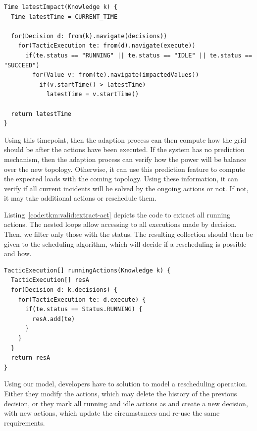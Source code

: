 \begin{lstlisting}[style=customc, caption=Get latest timepoint at which the impact will be measured, label=code:tkm:valid:latest-impact,basicstyle=\scriptsize]
Time latestImpact(Knowledge k) {
  Time latestTime = CURRENT_TIME
  
  for(Decision d: from(k).navigate(decisions))
    for(TacticExecution te: from(d).navigate(execute))
      if(te.status == "RUNNING" || te.status == "IDLE" || te.status == "SUCCEED")
        for(Value v: from(te).navigate(impactedValues))
          if(v.startTime() > latestTime)
            latestTime = v.startTime()
            
  return latestTime
}	
\end{lstlisting}

Using this timepoint, then the adaption process can then compute how the grid should be after the actions have been executed.
If the system has no prediction mechanism, then the adaption process can verify how the power will be balance over the new topology.
Otherwise, it can use this prediction feature to compute the expected loads with the coming topology.
Using these information, it can verify if all current incidents will be solved by the ongoing actions or not.
If not, it may take additional actions or reschedule them.

Listing~\ref{code:tkm:valid:extract-act} depicts the code to extract all running actions.
The nested loops allow accessing to all executions made by decision.
Then, we filter only those with the  status.
The resulting collection should then be given to the scheduling algorithm, which will decide if a rescheduling is possible and how. 

 
\begin{lstlisting}[style=customc, caption=Extract ongoing actions and their effects, label=code:tkm:valid:extract-act,basicstyle=\scriptsize]
TacticExecution[] runningActions(Knowledge k) {
  TacticExecution[] resA
  for(Decision d: k.decisions) {
    for(TacticExecution te: d.execute) {
      if(te.status == Status.RUNNING) {
        resA.add(te)
      }
    }
  }
  return resA
}
\end{lstlisting}

Using our model, developers have to solution to model a rescheduling operation.
Either they modify the actions, which may delete the history of the previous decision, or they mark all running and idle actions as  and create a new decision, with new actions, which update the circumstances and re-use the same requirements.

